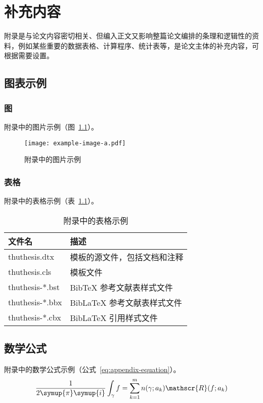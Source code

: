 \chapter{补充内容}

附录是与论文内容密切相关、但编入正文又影响整篇论文编排的条理和逻辑性的资料，例如某些重要的数据表格、计算程序、统计表等，是论文主体的补充内容，可根据需要设置。


\section{图表示例}

\subsection{图}

附录中的图片示例（图~\ref{fig:appendix-figure}）。

\begin{figure}
  \centering
  \texttt{[image: example-image-a.pdf]}
  \caption{附录中的图片示例}
  \label{fig:appendix-figure}
\end{figure}


\subsection{表格}

附录中的表格示例（表~\ref{tab:appendix-table}）。

\begin{table}
  \centering
  \caption{附录中的表格示例}
  \begin{tabular}{ll}
    \toprule
    文件名          & 描述                         \\
    \midrule
    thuthesis.dtx   & 模板的源文件，包括文档和注释 \\
    thuthesis.cls   & 模板文件                     \\
    thuthesis-*.bst & BibTeX 参考文献表样式文件    \\
    thuthesis-*.bbx & BibLaTeX 参考文献表样式文件  \\
    thuthesis-*.cbx & BibLaTeX 引用样式文件        \\
    \bottomrule
  \end{tabular}
  \label{tab:appendix-table}
\end{table}


\section{数学公式}

附录中的数学公式示例（公式~\eqref{eq:appendix-equation}）。
\begin{equation}
  \frac{1}{2 \symup{\pi} \symup{i}} \int_\gamma f = \sum_{k=1}^m n(\gamma; a_k) \mathscr{R}(f; a_k)
  \label{eq:appendix-equation}
\end{equation}
